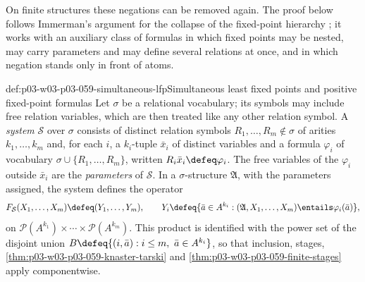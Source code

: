 On finite structures these negations can be removed again. The proof below
follows Immerman's argument for the collapse of the fixed-point hierarchy
\cite[Thm.~2 and Lemmas~4.1--4.7, pp.~94--100]{Immerman1986}; it works with
an auxiliary class of formulas in which fixed points may be nested, may
carry parameters and may define several relations at once, and in which
negation stands only in front of atoms.

\begin{hbdefinition}{def:p03-w03-p03-059-simultaneous-lfp}{Simultaneous least fixed points and positive fixed-point formulas}
Let \(\sigma\) be a relational vocabulary; its symbols may include free
relation variables, which are then treated like any other relation symbol.
A \emph{system} \(\mathcal S\) over \(\sigma\) consists of distinct relation
symbols \(R_1,\ldots,R_m\notin\sigma\) of arities \(k_1,\ldots,k_m\)
and, for each \(i\), a \(k_i\)-tuple \(\bar x_i\) of distinct variables and
a formula \(\varphi_i\) of vocabulary \(\sigma\cup\{R_1,\ldots,R_m\}\),
written \(R_i\bar x_i\defeq\varphi_i\). The free variables of the
\(\varphi_i\) outside \(\bar x_i\) are the \emph{parameters} of
\(\mathcal S\). In a \(\sigma\)-structure \(\mathfrak A\), with the
parameters assigned, the system defines the operator
\[
 F_{\mathcal S}(X_1,\ldots,X_m)\defeq(Y_1,\ldots,Y_m),\qquad
 Y_i\defeq\{\bar a\in A^{k_i}:(\mathfrak A,X_1,\ldots,X_m)\entails\varphi_i(\bar a)\},
\]
on \(\mathcal P(A^{k_1})\times\cdots\times\mathcal P(A^{k_m})\). This
product is identified with the power set of the disjoint union
\(B\defeq\{(i,\bar a):i\leq m,\ \bar a\in A^{k_i}\}\), so that inclusion,
stages, \cref{thm:p03-w03-p03-059-knaster-tarski} and
\cref{thm:p03-w03-p03-059-finite-stages} apply componentwise.


\end{hbdefinition}
